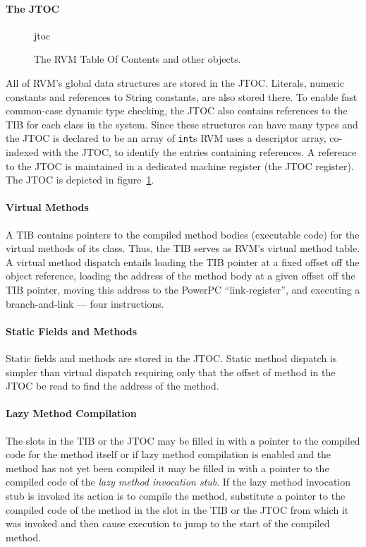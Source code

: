 \paragraph{The JTOC}
\begin{figure}[htb]
\begin{gif}{jtoc}
\vbox{
\hbox{}
}\hfil
\end{gif}
\caption{The RVM Table Of Contents and other objects.}
\label{fig:jtoc}
\end{figure}
All of RVM's global data structures are stored in the JTOC. 
Literals, numeric
constants and references to String constants, are also stored there.
To enable fast common-case dynamic type checking, the JTOC also
contains references to the TIB for each class in the system.  
Since these 
structures can have many types and the JTOC is declared to be an array of 
{\tt int}s  
RVM uses a descriptor array, co-indexed with the JTOC, 
to identify the entries containing references.
A reference to the JTOC is maintained in a dedicated machine register 
(the JTOC register).
The JTOC
is depicted in figure~\ref{fig:jtoc}.  

\paragraph{Virtual Methods}
A TIB contains pointers to the compiled method 
bodies (executable code) for the virtual methods of its class. 
Thus, the TIB serves as RVM's virtual method table.
A
virtual method dispatch entails loading the TIB pointer at a fixed
offset off the object reference, loading the address of the method
body at a given offset off the TIB pointer, moving this address to the
PowerPC ``link-register'', and executing a branch-and-link --- four
instructions.

\paragraph{Static Fields and Methods} 
Static fields and methods are stored in the JTOC. Static method dispatch is 
simpler than virtual dispatch requiring only that the offset of method in the 
JTOC be read to find the address of the method. 

\paragraph{Lazy Method Compilation}
The slots in the TIB or the JTOC may be filled in with 
a pointer to the compiled code for the method itself or if lazy method 
compilation is enabled and the method has not yet been compiled 
it may be filled in with
a pointer to the compiled code of the {\em lazy method invocation stub}.
If the lazy method invocation stub is invoked its action is to compile the 
method, substitute a pointer to the compiled code of the method in the slot in
the TIB or the JTOC from which it was invoked and then 
cause execution to jump to the start of the compiled method. 

